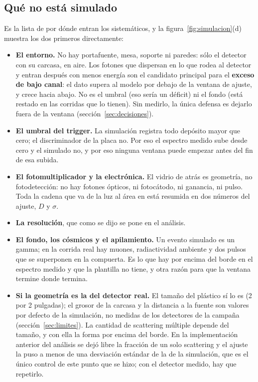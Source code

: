 \documentclass[11pt,a4paper]{article}
\begin{document}
\subsection{Qué no está simulado}

Es la lista de por dónde entran los sistemáticos, y la figura~\ref{fig:simulacion}(d)
muestra los dos primeros directamente:

\begin{itemize}
\item \textbf{El entorno.} No hay portafuente, mesa, soporte ni paredes:
      sólo el detector con su carcasa, en aire. Los fotones que dispersan en
      lo que rodea al detector y entran después con menos energía son el
      candidato principal para el \textbf{exceso de bajo canal}: el dato
      supera al modelo por debajo de la ventana de ajuste, y crece hacia
      abajo. No es el umbral (eso sería un déficit) ni el fondo (está
      restado en las corridas que lo tienen). Sin medirlo, la única defensa
      es dejarlo fuera de la ventana (sección~\ref{sec:decisiones}).
\item \textbf{El umbral del trigger.} La simulación registra todo depósito
      mayor que cero; el discriminador de la placa no. Por eso el espectro
      medido sube desde cero y el simulado no, y por eso ninguna ventana
      puede empezar antes del fin de esa subida.
\item \textbf{El fotomultiplicador y la electrónica.} El vidrio de atrás es
      geometría, no fotodetección: no hay fotones ópticos, ni fotocátodo, ni
      ganancia, ni pulso. Toda la cadena que va de la luz al área en \mVns{}
      está resumida en dos números del ajuste, $D$ y $\sigma$.
\item \textbf{La resolución}, que como se dijo se pone en el análisis.
\item \textbf{El fondo, los cósmicos y el apilamiento.} Un evento simulado
      es un gamma; en la corrida real hay muones, radiactividad ambiente y
      dos pulsos que se superponen en la compuerta. Es lo que hay por encima
      del borde en el espectro medido y que la plantilla no tiene, y otra
      razón para que la ventana termine donde termina.
\item \textbf{Si la geometría es la del detector real.} El tamaño del
      plástico sí lo es (2 por 2 pulgadas); el grosor de la carcasa y la
      distancia a la fuente son valores por defecto de la simulación, no
      medidas de los detectores de la campaña (sección~\ref{sec:limites}). La cantidad de
      scattering múltiple depende del tamaño, y con ella la forma por
      encima del borde. En la implementación anterior del análisis se dejó
      libre la fracción de un solo scattering y el ajuste la puso a menos de
      una desviación estándar de la de la simulación, que es el único control
      de este punto que se hizo; con el detector medido, hay que repetirlo.
\end{itemize}
\end{document}
